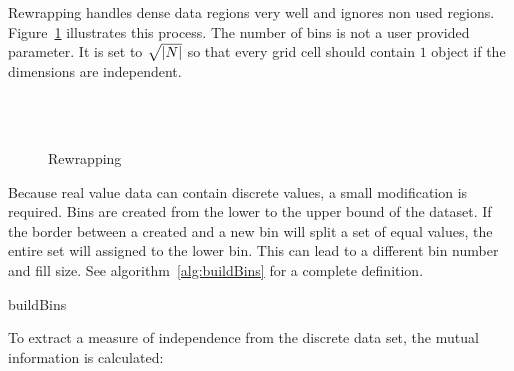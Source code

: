Rewrapping handles dense data regions very well and ignores non used regions. Figure~\ref{fig:rewrap} illustrates this process. The number of bins is not a user provided parameter. It is set to $\sqrt{\left|N\right|}$ so that every grid cell should contain $1$ object if the dimensions are independent.

\begin{figure}
	\caption{Rewrapping}
	\label{fig:rewrap}
	\centering
	\hfill
	\\
	\hfill
	\\
	\hfill
\end{figure}

Because real value data can contain discrete values, a small modification is required. Bins are created from the lower to the upper bound of the dataset. If the border between a created and a new bin will split a set of equal values, the entire set will assigned to the lower bin. This can lead to a different bin number and fill size. See algorithm~\ref{alg:buildBins} for a complete definition.

\begin{algorithm}



	\caption{buildBins}
	\label{alg:buildBins}
\end{algorithm}

To extract a measure of independence from the discrete data set, the mutual information is calculated:

